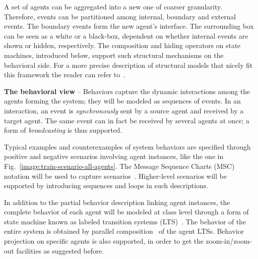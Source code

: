 A set of agents can be aggregated into a new one of coarser granularity. Therefore, events can be partitioned among internal, boundary and external events. The boundary events form the new agent's interface. The surrounding box can be seen as a white or a black-box, dependent on whether internal events are shown or hidden, respectively. The composition and hiding operators on state machines, introduced below, support such structural mechanisms on the behavioral side. For a more precise description of structural models that nicely fit this framework the reader can refer to~\cite{Magee:1995}.


\noindent \textbf{The behavioral view} -- Behaviors capture the dynamic interactions among the agents forming the system; they will be modeled as sequences of events. In an interaction, an event is \emph{synchronously} sent by a source agent and received by a target agent. The same event can in fact be received by several agents at once; a form of \emph{broadcasting} is thus supported. 

Typical examples and counterexamples of system behaviors are specified through positive and negative scenarios involving agent instances, like the one in Fig.~\ref{image:train-scenario-all-agents}. The Message Sequence Charts (MSC) notation will be used to capture scenarios~\cite{ITU:1996}. Higher-level scenarios will be supported by introducing sequences and loops in such descriptions.

In addition to the partial behavior description linking agent instances, the complete behavior of each agent will be modeled at class level through a form of state machine known as labeled transition systems (LTS)~\cite{Keller:1976, Milner:1989}. The behavior of the entire system is obtained by parallel composition~\cite{Hoare:1985} of the agent LTSs. Behavior  projection on specific agents is also supported, in order to get the zoom-in/zoom-out facilities as suggested before.

